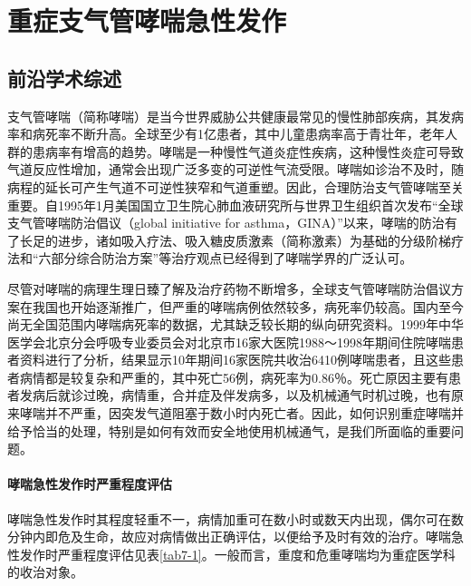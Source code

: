\chapter{重症支气管哮喘急性发作}

\section{前沿学术综述}

支气管哮喘（简称哮喘）是当今世界威胁公共健康最常见的慢性肺部疾病，其发病率和病死率不断升高。全球至少有1亿患者，其中儿童患病率高于青壮年，老年人群的患病率有增高的趋势。哮喘是一种慢性气道炎症性疾病，这种慢性炎症可导致气道反应性增加，通常会出现广泛多变的可逆性气流受限。哮喘如诊治不及时，随病程的延长可产生气道不可逆性狭窄和气道重塑。因此，合理防治支气管哮喘至关重要。自1995年1月美国国立卫生院心肺血液研究所与世界卫生组织首次发布“全球支气管哮喘防治倡议（global
initiative for
asthma，GINA）”以来，哮喘的防治有了长足的进步，诸如吸入疗法、吸入糖皮质激素（简称激素）为基础的分级阶梯疗法和“六部分综合防治方案”等治疗观点已经得到了哮喘学界的广泛认可。

尽管对哮喘的病理生理日臻了解及治疗药物不断增多，全球支气管哮喘防治倡议方案在我国也开始逐渐推广，但严重的哮喘病例依然较多，病死率仍较高。国内至今尚无全国范围内哮喘病死率的数据，尤其缺乏较长期的纵向研究资料。1999年中华医学会北京分会呼吸专业委员会对北京市16家大医院1988～1998年期间住院哮喘患者资料进行了分析，结果显示10年期间16家医院共收治6410例哮喘患者，且这些患者病情都是较复杂和严重的，其中死亡56例，病死率为0.86％。死亡原因主要有患者发病后就诊过晚，病情重，合并症及伴发病多，以及机械通气时机过晚，也有原来哮喘并不严重，因突发气道阻塞于数小时内死亡者。因此，如何识别重症哮喘并给予恰当的处理，特别是如何有效而安全地使用机械通气，是我们所面临的重要问题。

\subsubsection{哮喘急性发作时严重程度评估}

哮喘急性发作时其程度轻重不一，病情加重可在数小时或数天内出现，偶尔可在数分钟内即危及生命，故应对病情做出正确评估，以便给予及时有效的治疗。哮喘急性发作时严重程度评估见表\ref{tab7-1}。一般而言，重度和危重哮喘均为重症医学科的收治对象。

